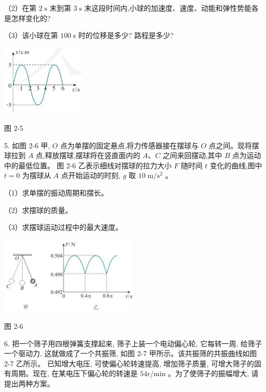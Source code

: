 \documentclass[10pt]{article}
\begin{document}
（2）在第 \(2\mathrm{\;s}\) 末到第 \(3\mathrm{\;s}\) 末这段时间内,小球的加速度、速度、动能和弹性势能各是怎样变化的?

（3）该小球在第 \({100}\mathrm{\;s}\) 时的位移是多少? 路程是多少?

\begin{center}
\includegraphics[max width=0.3\textwidth]{images/01910e4c-ebb8-7d2c-8f2f-2375bc1d2d12_65_497014.jpg}
\end{center}

图 2-5

5. 如图 2-6 甲, \(O\) 点为单摆的固定悬点,将力传感器接在摆球与 \(O\) 点之间。现将摆球拉到 \(A\) 点,释放摆球,摆球将在竖直面内的 \(A\text{、}C\) 之间来回摆动,其中 \(B\) 点为运动中的最低位置。 图 2-6 乙表示细线对摆球的拉力大小 \(F\) 随时间 \(t\) 变化的曲线,图中 \(t = 0\) 为摆球从 \(A\) 点开始运动的时刻, \(g\) 取 \({10}\mathrm{\;m}/{\mathrm{s}}^{2}\) 。

（1）求单摆的振动周期和摆长。

（2）求摆球的质量。

（3）求摆球运动过程中的最大速度。

\begin{center}
\includegraphics[max width=0.5\textwidth]{images/01910e4c-ebb8-7d2c-8f2f-2375bc1d2d12_65_686658.jpg}
\end{center}

图 2-6

6. 把一个筛子用四根弹簧支撑起来, 筛子上装一个电动偏心轮, 它每转一周, 给筛子一个驱动力, 这就做成了一个共振筛, 如图 2-7 甲所示。该共振筛的共振曲线如图 2-7 乙所示。 已知增大电压, 可使偏心轮转速提高, 增加筛子质量, 可增大筛子的固有周期。现在, 在某电压下偏心轮的转速是 \({54}\mathrm{r}/\mathrm{{min}}\) 。为了使筛子的振幅增大, 请提出两种方案。
\end{document}
